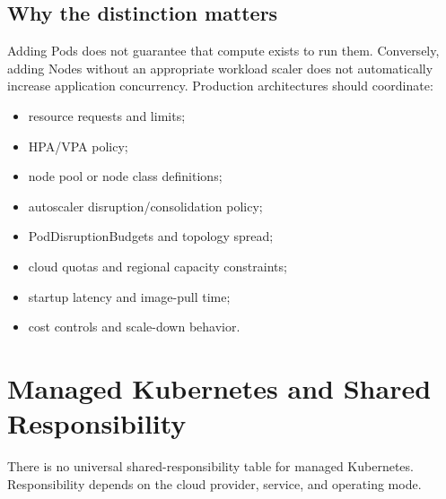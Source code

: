 \documentclass[11pt]{article}
\begin{document}
\subsection{Why the distinction matters}
Adding Pods does not guarantee that compute exists to run them. Conversely, adding Nodes without an appropriate workload scaler does not automatically increase application concurrency. Production architectures should coordinate:

\begin{itemize}
  \item resource requests and limits;
  \item HPA/VPA policy;
  \item node pool or node class definitions;
  \item autoscaler disruption/consolidation policy;
  \item PodDisruptionBudgets and topology spread;
  \item cloud quotas and regional capacity constraints;
  \item startup latency and image-pull time;
  \item cost controls and scale-down behavior.
\end{itemize}

\section{Managed Kubernetes and Shared Responsibility}

There is no universal shared-responsibility table for managed Kubernetes. Responsibility depends on the cloud provider, service, and operating mode.
\end{document}
